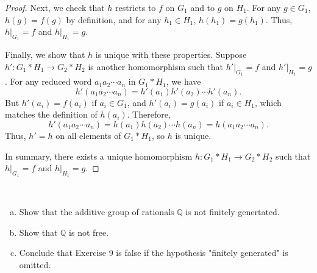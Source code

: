 \documentclass{article}
\def\qq{{\mathbb Q}}
\begin{document}
\begin{proof}
    Next, we check that $h$ restricts to $f$ on $G_1$ and to $g$ on $H_1$. For any $g \in G_1$, $h(g) = f(g)$ by definition, and for any $h_1 \in H_1$, $h(h_1) = g(h_1)$. Thus, $h|_{G_1} = f$ and $h|_{H_1} = g$.

    Finally, we show that $h$ is unique with these properties. Suppose $h' : G_1 * H_1 \to G_2 * H_2$ is another homomorphism such that $h'|_{G_1} = f$ and $h'|_{H_1} = g$. For any reduced word $a_1 a_2 \cdots a_n$ in $G_1 * H_1$, we have
    \[
        h'(a_1 a_2 \cdots a_n) = h'(a_1) h'(a_2) \cdots h'(a_n).
    \]
    But $h'(a_i) = f(a_i)$ if $a_i \in G_1$, and $h'(a_i) = g(a_i)$ if $a_i \in H_1$, which matches the definition of $h(a_i)$. Therefore,
    \[
        h'(a_1 a_2 \cdots a_n) = h(a_1) h(a_2) \cdots h(a_n) = h(a_1 a_2 \cdots a_n).
    \]
    Thus, $h' = h$ on all elements of $G_1 * H_1$, so $h$ is unique.

    In summary, there exists a unique homomorphism $h : G_1 * H_1 \to G_2 * H_2$ such that $h|_{G_1} = f$ and $h|_{H_1} = g$.
\end{proof}




\begin{problem}[2.1.10] \\
    \begin{enumerate}[(a)]
        \item Show that the additive group of rationals $\qq$ is not finitely genertated.
        \item Show that $\qq$ is not free.
        \item Conclude that Exercise 9 is false if the hypothesis "finitely generated" is omitted.
    \end{enumerate}
\end{problem}
\end{document}
